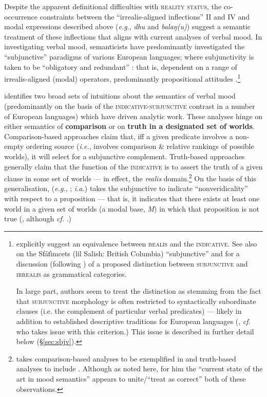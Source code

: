 Despite the apparent definitional difficulties with \textsc{reality status}, the co-occurrence constraints between the ``irrealis-aligned inflections'' \gls{II} and \gls{IV} and modal expressions described above (\textit{e.g.}, \textit{dhu }and\textit{ balaŋ(u)}) suggest a semantic treatment of these inflections that aligns with current analyses of verbal mood. In investigating verbal mood, semanticists have predominantly investigated  the ``subjunctive'' paradigms of various European languages; where subjunctivity is taken to be ``obligatory and redundant'' : that is, dependent on a range of irrealis-aligned (modal) operators, predominantly propositional attitudes \citep{Palmer2001}.\footnote{\citet[238]{Chung} explicitly suggest an equivalence between \textsc{realis} and the \textsc{indicative}. See also \citealt{Matthewson2010} on the St̓át̓imcets (\gls{lil} Salish: British Columbia) ``subjunctive'' and for a discussion (following \citealt{Palmer2001}) of a proposed distinction between \textsc{subjunctive} and \textsc{irrealis} as grammatical categories.
	
	In large part, authors seem to treat the distinction as stemming from the fact that \textsc{subjunctive} morphology is often restricted to syntactically subordinate clauses (i.e. the complement of particular verbal predicates) --- likely in addition to established descriptive traditions for European languages (\citealp[see also][169\textit{ff}]{Mauri2016}, \textit{cf. }\citet[13, fn 9]{Matthewson2010} who takes issue with this criterion.) This issue is described in further detail below (\S\ref{sec:sbjv}).\label{SJVvIRR}}

\citet[§ 2.2]{Portner2018a} identifies two broad sets of intuitions about the semantics of verbal mood (predominantly on the basis of the \textsc{indicative-subjunctive} contrast in a number of European languages) which have driven analytic work. These analyses hinge on either semantics of \textbf{comparison} or on \textbf{truth in a designated set of worlds}. Comparison-based approaches claim that, iff a given predicate involves a non-empty ordering source (\textit{i.e.}, involves comparison \& relative rankings of possible worlds), it will select for a subjunctive complement. Truth-based approaches generally claim that the function  of the \textsc{indicative} is to assert the truth of a given clause in some set of worlds --- in effect, the \textit{realis} domain.\footnote{\citet{Portner2018a} takes comparison-based analyses to be exemplified in \citealt{Portner2012,Anand2013,Giorgi1997,Villalta2008} and truth-based analyses to include \citealt{Giannakidou2011,Farkas1992,Farkas2003,Huntley1984,Quer2001,Portner1997}. Although as noted here, for him the ``current state of the art in mood semantics'' appears to unite/``treat as correct'' both of these observations.} On the basis of this generalisation, \citeauthor{Gian2016} (\textit{e.g.}, \citeyear{Gian2016}; \citealp{Giannakidou2020} \textit{i.a.}) takes the subjunctive to indicate ``nonveridicality'' with respect to a proposition --- that is, it indicates that there exists at least one world in a given set of worlds (a modal base, \textit{M}) in which that proposition is not true (, although \textit{cf.} \citet{Wilt2016}.)

